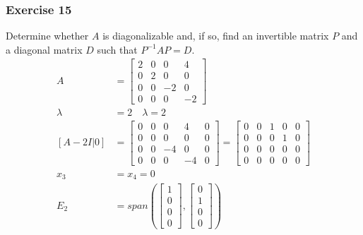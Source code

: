 \documentclass{math}
\begin{document}
\subsubsection*{Exercise 15}
Determine whether \( A \) is diagonalizable and, if so, find an invertible
matrix \( P \) and a diagonal matrix \( D \) such that \( P^{-1}AP = D \).
\begin{align*}
  A &= \begin{bmatrix}
    2 & 0 & 0 & 4 \\
    0 & 2 & 0 & 0 \\
    0 & 0 & -2 & 0 \\
    0 & 0 & 0 & -2
  \end{bmatrix} \\
  \lambda &= 2 \quad \lambda = 2 \\
  [A-2I|0] &= \begin{bmatrix}
    0 & 0 & 0 & 4 & 0 \\
    0 & 0 & 0 & 0 & 0 \\
    0 & 0 & -4 & 0 & 0 \\
    0 & 0 & 0 & -4 & 0
  \end{bmatrix} = \begin{bmatrix}
    0 & 0 & 1 & 0 & 0 \\
    0 & 0 & 0 & 1 & 0 \\
    0 & 0 & 0 & 0 & 0 \\
    0 & 0 & 0 & 0 & 0
  \end{bmatrix} \\
  x_3 &= x_4 = 0 \\
  E_2 &= span\left(\begin{bmatrix}1 \\ 0 \\ 0 \\ 0\end{bmatrix},
    \begin{bmatrix}0 \\ 1 \\ 0 \\ 0\end{bmatrix}\right)
\end{align*}
\end{document}
